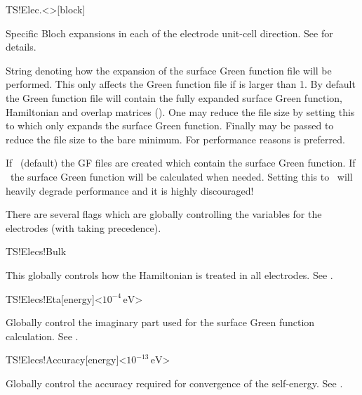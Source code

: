 \begin{fdfentry}{TS!Elec.<>}[block]
\begin{fdfoptions}
    \option[Bloch-A/a1|B/a2|C/a3]%
    Specific Bloch expansions in each of the electrode unit-cell
    direction. See  for details.

    String denoting how the expansion of the surface Green function
    file will be performed. This only affects the Green function file
    if  is larger than 1. By default the Green function
    file will contain the fully expanded surface Green function,
    Hamiltonian and overlap matrices (). One may reduce the
    file size by setting this to  which only expands the
    surface Green function. Finally  may be passed to
    reduce the file size to the bare minimum. 
    For performance reasons  is preferred. 

    If \fdftrue\ (default) the GF files are created which contain
    the surface Green function.
    If \fdffalse\ the surface Green function will be calculated when
    needed. 
    Setting this to \fdffalse\ will heavily degrade performance and
    it is highly discouraged!

  \end{fdfoptions}
  
\end{fdfentry}

There are several flags which are globally controlling the variables
for the electrodes (with  taking precedence).

\begin{fdflogicalT}{TS!Elecs!Bulk}

  This globally controls how the Hamiltonian is treated in all
  electrodes. 
  See .
  
\end{fdflogicalT}

\begin{fdfentry}{TS!Elecs!Eta}[energy]<$10^{-4}\,\mathrm{eV}$>
  
  Globally control the imaginary part used for the surface Green
  function calculation.
  See .
  
\end{fdfentry}

\begin{fdfentry}{TS!Elecs!Accuracy}[energy]<$10^{-13}\,\mathrm{eV}$>
  
  Globally control the accuracy required for convergence of the self-energy.
  See .
  
\end{fdfentry}

